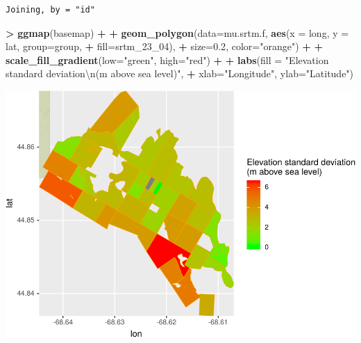 \documentclass[]{krantz}
\makeatletter
\newenvironment{Shaded}{\begin{snugshade}}{\end{snugshade}}
\newcommand{\CharTok}[1]{\textcolor[rgb]{0.5,0.5,0.5}{#1}}
\newcommand{\DataTypeTok}[1]{\textcolor[rgb]{0.27,0.27,0.27}{#1}}
\newcommand{\DecValTok}[1]{\textcolor[rgb]{0.06,0.06,0.06}{#1}}
\newcommand{\FloatTok}[1]{\textcolor[rgb]{0.06,0.06,0.06}{#1}}
\newcommand{\KeywordTok}[1]{\textcolor[rgb]{0.27,0.27,0.27}{\textbf{#1}}}
\newcommand{\NormalTok}[1]{#1}
\newcommand{\OperatorTok}[1]{\textcolor[rgb]{0.43,0.43,0.43}{\textbf{#1}}}
\newcommand{\StringTok}[1]{\textcolor[rgb]{0.5,0.5,0.5}{#1}}
\newenvironment{kframe}{%
\medskip{}
\setlength{\fboxsep}{.8em}
 \def\at@end@of@kframe{}%
 \ifinner\ifhmode%
  \def\at@end@of@kframe{\end{minipage}}%
  \begin{minipage}{\columnwidth}%
 \fi\fi%
 \def\FrameCommand##1{\hskip\@totalleftmargin \hskip-\fboxsep
 \colorbox{shadecolor}{##1}\hskip-\fboxsep
     \hskip-\linewidth \hskip-\@totalleftmargin \hskip\columnwidth}%
 \MakeFramed {\advance\hsize-\width
   \@totalleftmargin\z@ \linewidth\hsize
   \@setminipage}}%
 {\par\unskip\endMakeFramed%
 \at@end@of@kframe}
\renewenvironment{Shaded}{\begin{kframe}}{\end{kframe}}
\makeatother
\begin{document}
\begin{verbatim}
Joining, by = "id"
\end{verbatim}

\begin{Shaded}
\begin{Highlighting}[]
\OperatorTok{>}\StringTok{ }\KeywordTok{ggmap}\NormalTok{(basemap) }\OperatorTok{+}
\OperatorTok{+}\StringTok{     }\KeywordTok{geom_polygon}\NormalTok{(}\DataTypeTok{data=}\NormalTok{mu.srtm.f, }\KeywordTok{aes}\NormalTok{(}\DataTypeTok{x =}\NormalTok{ long, }\DataTypeTok{y =}\NormalTok{ lat, }\DataTypeTok{group=}\NormalTok{group, }
\OperatorTok{+}\StringTok{                                      }\DataTypeTok{fill=}\NormalTok{srtm_}\DecValTok{23}\NormalTok{_}\DecValTok{04}\NormalTok{), }
\OperatorTok{+}\StringTok{                  }\DataTypeTok{size=}\FloatTok{0.2}\NormalTok{, }\DataTypeTok{color=}\StringTok{"orange"}\NormalTok{) }\OperatorTok{+}
\OperatorTok{+}\StringTok{     }\KeywordTok{scale_fill_gradient}\NormalTok{(}\DataTypeTok{low=}\StringTok{"green"}\NormalTok{, }\DataTypeTok{high=}\StringTok{"red"}\NormalTok{) }\OperatorTok{+}
\OperatorTok{+}\StringTok{         }\KeywordTok{labs}\NormalTok{(}\DataTypeTok{fill =} \StringTok{"Elevation standard deviation}\CharTok{\textbackslash{}n}\StringTok{(m above sea level)"}\NormalTok{, }
\OperatorTok{+}\StringTok{          }\DataTypeTok{xlab=}\StringTok{"Longitude"}\NormalTok{, }\DataTypeTok{ylab=}\StringTok{"Latitude"}\NormalTok{)}
\end{Highlighting}
\end{Shaded}

\includegraphics{bookdown_files/figure-latex/unnamed-chunk-207-1.pdf}
\end{document}
